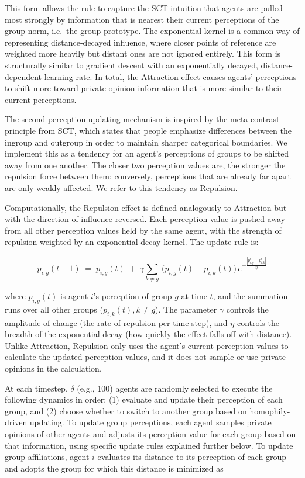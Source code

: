 This form allows the rule to capture the SCT intuition that agents are pulled most strongly by information that is nearest their current perceptions of the group norm, i.e.~the group prototype. The exponential kernel is a common way of representing distance-decayed influence, where closer points of reference are weighted more heavily but distant ones are not ignored entirely. This form is structurally similar to gradient descent with an exponentially decayed, distance-dependent learning rate. In total, the Attraction effect causes agents' perceptions to shift more toward private opinion information that is more similar to their current perceptions.

The second perception updating mechanism is inspired by the meta-contrast principle from SCT, which states that people emphasize differences between the ingroup and outgroup in order to maintain sharper categorical boundaries. We implement this as a tendency for an agent's perceptions of groups to be shifted away from one another. The closer two perception values are, the stronger the repulsion force between them; conversely, perceptions that are already far apart are only weakly affected. We refer to this tendency as Repulsion.

Computationally, the Repulsion effect is defined analogously to Attraction but with the direction of influence reversed. Each perception value is pushed away from all other perception values held by the same agent, with the strength of repulsion weighted by an exponential-decay kernel. The update rule is:

\[
p_{i,g}(t+1) \;=\; p_{i,g}(t) \;+\; \gamma \sum_{k \neq g} \, \bigl(p_{i,g}(t) - p_{i,k}(t) \bigr)\,
e^{-\tfrac{|p_{i,g}^t - p_{i,k}^t|}{\eta}}
\]

where $p_{i,g}(t)$ is agent $i$'s perception of group $g$ at time $t$, and the summation runs over all other groups ($p_{i,k}(t), k \neq g$). The parameter $\gamma$ controls the amplitude of change (the rate of repulsion per time step), and $\eta$ controls the breadth of the exponential decay (how quickly the effect falls off with distance). Unlike Attraction, Repulsion only uses the agent's current perception values to calculate the updated perception values, and it does not sample or use private opinions in the calculation. 

At each timestep, $\delta$ (e.g., 100) agents are randomly selected to execute the following dynamics in order: (1) evaluate and update their perception of each group, and (2) choose whether to switch to another group based on homophily-driven updating. To update group perceptions, each agent samples private opinions of other agents and adjusts its perception value for each group based on that information, using specific update rules explained further below. To update group affiliations, agent $i$ evaluates its distance to its perception of each group and adopts the group for which this distance is minimized as

